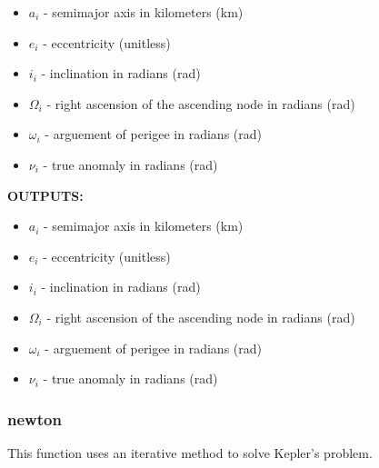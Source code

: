 \documentclass[11pt, reqno]{article}    %
\begin{document}
\begin{itemize}
    \item \( a_i \)  - semimajor axis in kilometers (\si{\kilo\meter})
    \item \( e_i \) - eccentricity (unitless)
    \item \( i_i \) - inclination in radians (\si{\radian})
    \item \( \Omega_i \) - right ascension of the ascending node in radians (\si{\radian})
    \item \( \omega_i \) - arguement of perigee in radians (\si{\radian})
    \item \( \nu_i \) - true anomaly in radians (\si{\radian})
\end{itemize}

\noindent \textbf{OUTPUTS:}
\begin{itemize}
    \item \( a_i \)  - semimajor axis in kilometers (\si{\kilo\meter})
    \item \( e_i \) - eccentricity (unitless)
    \item \( i_i \) - inclination in radians (\si{\radian})
    \item \( \Omega_i \) - right ascension of the ascending node in radians (\si{\radian})
    \item \( \omega_i \) - arguement of perigee in radians (\si{\radian})
    \item \( \nu_i \) - true anomaly in radians (\si{\radian})
\end{itemize}

\subsubsection*{newton}

This function uses an iterative method to solve Kepler's problem.
\end{document}
